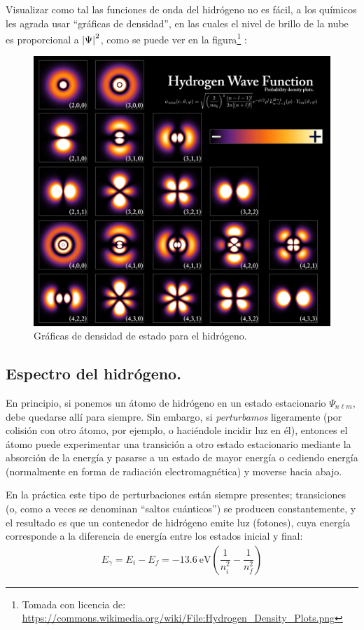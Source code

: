 \newpage
Visualizar como tal las funciones de onda del hidrógeno no es fácil, a los químicos les agrada usar \enquote{gráficas de densidad}, en las cuales el nivel de brillo de la nube es proporcional a $\abs{\Psi}^{2}$, como se puede ver en la figura\footnote{Tomada con licencia de: \url{https://commons.wikimedia.org/wiki/File:Hydrogen_Density_Plots.png}} :
\begin{figure}[H]
    \centering
    \includegraphics[scale=0.2]{Imagenes/Hydrogen_Density_Plots.png}
    \caption{Gráficas de densidad de estado para el hidrógeno.}
\end{figure}

\newpage
\subsection{Espectro del hidrógeno.}

En principio, si ponemos un átomo de hidrógeno en un estado estacionario $\Psi_{n \ell m}$, debe quedarse allí para siempre. Sin embargo, si \emph{perturbamos} ligeramente (por colisión con otro átomo, por ejemplo, o haciéndole incidir  luz en él), entonces el átomo puede experimentar una transición a otro estado estacionario mediante la absorción de la energía y pasarse a un estado de mayor energía o cediendo energía (normalmente en forma de radiación electromagnética) y moverse  hacia abajo.
\par
En la práctica este tipo de perturbaciones están siempre presentes; transiciones (o, como a veces se denominan \enquote{saltos cuánticos}) se producen constantemente, y el resultado es que un contenedor de hidrógeno emite luz (fotones), cuya energía corresponde a la diferencia de energía entre los estados inicial y final:
\begin{align}
E_{\gamma} = E_{i} - E_{f} = \SI{-13.6}{\electronvolt} \left( \dfrac{1}{n_{i}^{2}} - \dfrac{1}{n_{f}^{2}} \right)
\label{eq:ecuacion_04_91}
\end{align}

